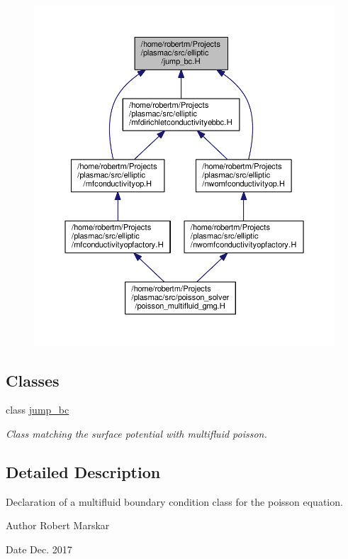 \begin{figure}[H]
\begin{center}
\leavevmode
\includegraphics[width=350pt]{jump__bc_8H__dep__incl}
\end{center}
\end{figure}
\subsection*{Classes}
\begin{DoxyCompactItemize}
\item 
class \hyperlink{classjump__bc}{jump\+\_\+bc}
\begin{DoxyCompactList}\small\item\em Class matching the surface potential with multifluid poisson. \end{DoxyCompactList}\end{DoxyCompactItemize}


\subsection{Detailed Description}
Declaration of a multifluid boundary condition class for the poisson equation. 

\begin{DoxyAuthor}{Author}
Robert Marskar 
\end{DoxyAuthor}
\begin{DoxyDate}{Date}
Dec. 2017 
\end{DoxyDate}
